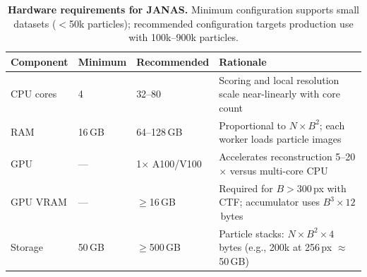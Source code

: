 %

\begin{table}[!ht]
\caption{\textbf{Hardware requirements for JANAS.}
Minimum configuration supports small datasets ($<$50k particles); recommended configuration targets production use with 100k--900k particles.}
\label{tab:hardware}
\centering
\small
\begin{tabular}{@{}l l l p{5.5cm}@{}}
\toprule
\textbf{Component} & \textbf{Minimum} & \textbf{Recommended} & \textbf{Rationale} \\
\midrule
CPU cores   & 4       & 32--80     & Scoring and local resolution scale near-linearly with core count \\[4pt]
RAM         & 16\,GB  & 64--128\,GB & Proportional to $N \times B^2$; each worker loads particle images \\[4pt]
GPU         & ---     & 1$\times$ A100/V100 & Accelerates reconstruction 5--20$\times$ versus multi-core CPU \\[4pt]
GPU VRAM    & ---     & $\geq$16\,GB & Required for $B > 300$\,px with CTF; accumulator uses $B^3 \times 12$\,bytes \\[4pt]
Storage     & 50\,GB  & $\geq$500\,GB & Particle stacks: $N \times B^2 \times 4$\,bytes (e.g., 200k at 256\,px $\approx$ 50\,GB) \\
\bottomrule
\end{tabular}
\end{table}
